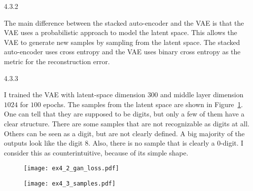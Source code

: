 \begin{task}{4.3.2}
\end{task}

The main difference between the stacked auto-encoder and the VAE is that the VAE uses a
probabilistic approach to model the latent space. This allows the VAE to generate new samples by
sampling from the latent space. The stacked auto-encoder uses cross entropy and the VAE uses binary
cross entropy as the metric for the reconstruction error.



\begin{task}{4.3.3}
\end{task}

I trained the VAE with latent-space dimension $300$ and middle layer dimension $1024$ for $100$
epochs. The samples from the latent space are shown in Figure~\ref{fig:ex4_3_samples}. One can tell
that they are supposed to be digits, but only a few of them have a clear structure. There are some
samples that are not recognizable as digits at all. Others can be seen as a digit, but are not
clearly defined. A big majority of the outputs look like the digit $8$. Also, there is no sample
that is clearly a $0$-digit. I consider this as counterintuitive, because of its simple shape.

\begin{figure}[ht]
  \centering
  \hspace*{\fill}%
  \begin{minipage}{0.55\textwidth}
    \centering
    \texttt{[image: ex4\_2\_gan\_loss.pdf]}
    \label{fig:ex4_2_gan_loss}
  \end{minipage}
  \hspace*{\fill}%
  \begin{minipage}{0.40\textwidth}
    \centering
    \texttt{[image: ex4\_3\_samples.pdf]}
    \label{fig:ex4_3_samples}
  \end{minipage}
  \hspace*{\fill}%
\end{figure}



